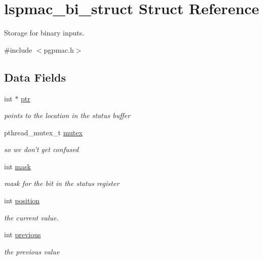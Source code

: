 \hypertarget{structlspmac__bi__struct}{\section{lspmac\-\_\-bi\-\_\-struct Struct Reference}
\label{structlspmac__bi__struct}
}


Storage for binary inputs.  




{\ttfamily \#include $<$pgpmac.\-h$>$}

\subsection*{Data Fields}
\begin{DoxyCompactItemize}
\item 
int $\ast$ \hyperlink{structlspmac__bi__struct_ae201bf05130bcb6985704ea42efabeb3}{ptr}
\begin{DoxyCompactList}\small\item\em points to the location in the status buffer \end{DoxyCompactList}\item 
pthread\-\_\-mutex\-\_\-t \hyperlink{structlspmac__bi__struct_a58053a98fa4696b56d674e775b3b4690}{mutex}
\begin{DoxyCompactList}\small\item\em so we don't get confused \end{DoxyCompactList}\item 
int \hyperlink{structlspmac__bi__struct_ac010058c9883088705059dee1d90ee72}{mask}
\begin{DoxyCompactList}\small\item\em mask for the bit in the status register \end{DoxyCompactList}\item 
int \hyperlink{structlspmac__bi__struct_a76c4627028b86141c101f1764bebb7b0}{position}
\begin{DoxyCompactList}\small\item\em the current value. \end{DoxyCompactList}\item 
int \hyperlink{structlspmac__bi__struct_a00f09cb3d7bdbe1058fb56bb8c2b0fa3}{previous}
\begin{DoxyCompactList}\small\item\em the previous value \end{DoxyCompactList}\item 

\end{DoxyCompactItemize}
